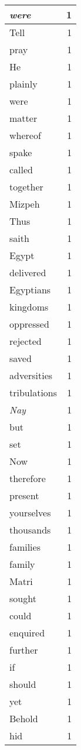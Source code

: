 \begin{center}
\begin{longtable}{l|r}
\emph{were} & 1 \\ \hline
Tell & 1 \\ \hline
pray & 1 \\ \hline
He & 1 \\ \hline
plainly & 1 \\ \hline
were & 1 \\ \hline
matter & 1 \\ \hline
whereof & 1 \\ \hline
spake & 1 \\ \hline
called & 1 \\ \hline
together & 1 \\ \hline
Mizpeh & 1 \\ \hline
Thus & 1 \\ \hline
saith & 1 \\ \hline
Egypt & 1 \\ \hline
delivered & 1 \\ \hline
Egyptians & 1 \\ \hline
kingdoms & 1 \\ \hline
oppressed & 1 \\ \hline
rejected & 1 \\ \hline
saved & 1 \\ \hline
adversities & 1 \\ \hline
tribulations & 1 \\ \hline
\emph{Nay} & 1 \\ \hline
but & 1 \\ \hline
set & 1 \\ \hline
Now & 1 \\ \hline
therefore & 1 \\ \hline
present & 1 \\ \hline
yourselves & 1 \\ \hline
thousands & 1 \\ \hline
families & 1 \\ \hline
family & 1 \\ \hline
Matri & 1 \\ \hline
sought & 1 \\ \hline
could & 1 \\ \hline
enquired & 1 \\ \hline
further & 1 \\ \hline
if & 1 \\ \hline
should & 1 \\ \hline
yet & 1 \\ \hline
Behold & 1 \\ \hline
hid & 1 \\ \hline

\end{longtable}
\end{center}
